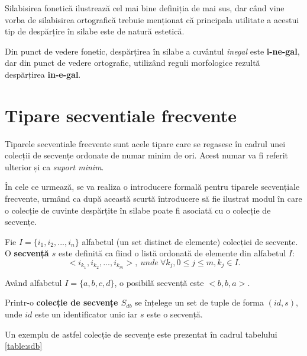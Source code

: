 Silabisirea fonetică ilustrează cel mai bine definiția de mai sus, dar când vine vorba de silabisirea ortografică trebuie menționat că principala utilitate a acestui tip de despărțire în silabe este de natură  estetică.

\begin{ex}
Din punct de vedere fonetic, despărțirea în silabe a cuvântul \textit{inegal} este \textbf{i-ne-gal}, dar din punct de vedere ortografic, utilizând reguli morfologice rezultă despărțirea \textbf{in-e-gal}. 
\end{ex}

\section{Tipare secventiale frecvente}

Tiparele secventiale frecvente sunt acele tipare care se regasesc în cadrul unei colecții de secvențe ordonate de numar minim de ori. Acest numar va fi referit ulterior și ca \textit{suport minim}. 

În cele ce urmează, se va realiza o introducere formală pentru tiparele secvențiale frecvente, urmând ca după această scurtă întroducere să fie ilustrat modul în care o colecție de cuvinte despărțite în silabe poate fi asociată cu o colecție de secvențe.

\begin{defi}
Fie $I = \{i_1, i_2, ...,i_n\}$ alfabetul (un set distinct de elemente) colecției de secvențe. O \textbf{secvență $s$} este definită ca fiind o listă ordonată de elemente din alfabetul $I$:
\begin{equation}
<i_{k_1},i_{k_2}, ...,i_{k_m}>,\ unde \ \forall k_j, 0 \leq j \leq m, k_j \in I.
\end{equation}
\end{defi}

\begin{ex} 
Având alfabetul $I=\{a,b,c,d\}$, o posibilă secvență este $<b,b,a>$.
\end{ex}

\begin{defi} 
Printr-o \textbf{colecție de secvențe $S_{db}$} se înțelege un set de tuple de forma $(id, s)$, unde $id$ este un identificator unic iar $s$ este o secvență. 
\end{defi}

\begin{ex}
Un exemplu de astfel colecție de secvențe este prezentat în cadrul tabelului \ref{table:sdb}
\end{ex}

